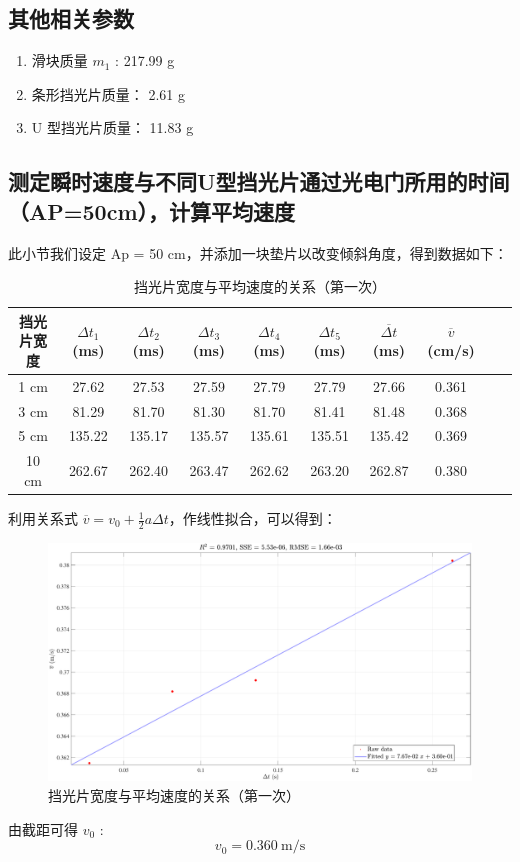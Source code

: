 \documentclass[UTF8]{article}
\theoremstyle{MyLineTheoremStyle} %
\theoremstyle{MyBlockTheoremStyle} %
\theoremstyle{MySubsubsectionStyle} %
\begin{document}
\subsection{其他相关参数}
\begin{enumerate}
\item 滑块质量 $m_1$ : 217.99 g
\item 条形挡光片质量： 2.61 g
\item U 型挡光片质量： 11.83 g
\end{enumerate}


\subsection{测定瞬时速度与不同U型挡光片通过光电门所用的时间（AP=50cm），计算平均速度}
此小节我们设定 Ap = 50 cm，并添加一块垫片以改变倾斜角度，得到数据如下：

\begin{table}[H]\centering
    \caption{挡光片宽度与平均速度的关系（第一次）}
\begin{tabular}{cccccccccc}\toprule
    挡光片宽度 & $\Delta t_1$ (ms) & $\Delta t_2$ (ms) & $\Delta t_3$ (ms) & $\Delta t_4$ (ms) & $\Delta t_5$ (ms) & $\overline{\Delta t}$ (ms) & $\overline{v}$ (cm/s)  \\
    \midrule
    1 cm   &27.62	&27.53	&27.59	&27.79	&27.79	&27.66  & 0.361\\
    3  cm  &81.29	&81.70	&81.30	&81.70	&81.41	&81.48  & 0.368\\
    5  cm  &135.22	&135.17	&135.57	&135.61	&135.51	&135.42 & 0.369\\
    10  cm &262.67	&262.40	&263.47	&262.62	&263.20	&262.87 & 0.380\\
    \bottomrule
\end{tabular}
\end{table}
利用关系式 $\overline{v} = v_0 + \frac{1}{2}a \Delta t$，作线性拟合，可以得到：
\begin{figure}[H]\centering
    \includegraphics[width=0.9\columnwidth]{assets/8.pdf}
    \caption{挡光片宽度与平均速度的关系（第一次）}
\end{figure}
由截距可得 $v_0$ : 
\begin{equation}
v_0 = 0.360 \ \mathrm{m/s}
\end{equation}
\end{document}
